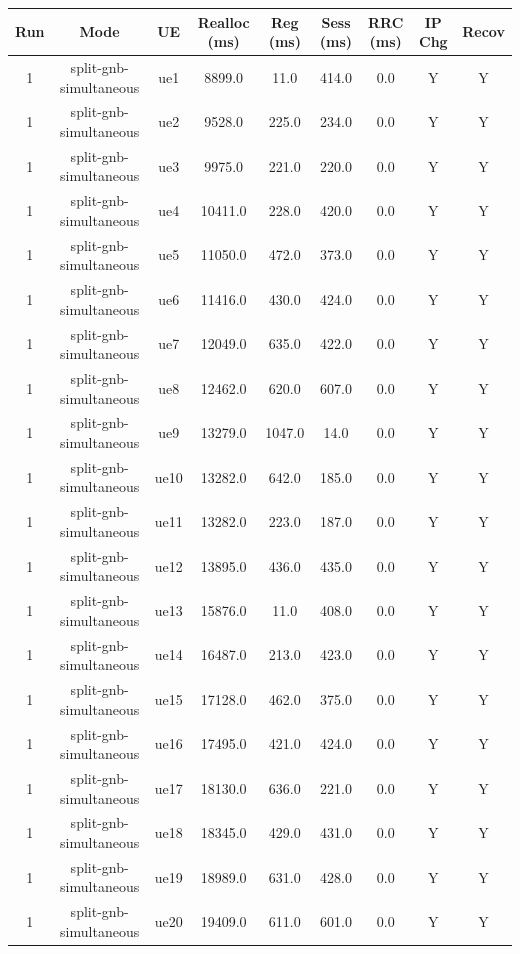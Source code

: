 \begin{table}[ht]
\centering
\begin{tabular}{|c|c|c|c|c|c|c|c|c|}
\hline
Run & Mode & UE & Realloc (ms) & Reg (ms) & Sess (ms) & RRC (ms) & IP Chg & Recov \\
\hline
1 & split-gnb-simultaneous & ue1 & 8899.0 & 11.0 & 414.0 & 0.0 & Y & Y \\
1 & split-gnb-simultaneous & ue2 & 9528.0 & 225.0 & 234.0 & 0.0 & Y & Y \\
1 & split-gnb-simultaneous & ue3 & 9975.0 & 221.0 & 220.0 & 0.0 & Y & Y \\
1 & split-gnb-simultaneous & ue4 & 10411.0 & 228.0 & 420.0 & 0.0 & Y & Y \\
1 & split-gnb-simultaneous & ue5 & 11050.0 & 472.0 & 373.0 & 0.0 & Y & Y \\
1 & split-gnb-simultaneous & ue6 & 11416.0 & 430.0 & 424.0 & 0.0 & Y & Y \\
1 & split-gnb-simultaneous & ue7 & 12049.0 & 635.0 & 422.0 & 0.0 & Y & Y \\
1 & split-gnb-simultaneous & ue8 & 12462.0 & 620.0 & 607.0 & 0.0 & Y & Y \\
1 & split-gnb-simultaneous & ue9 & 13279.0 & 1047.0 & 14.0 & 0.0 & Y & Y \\
1 & split-gnb-simultaneous & ue10 & 13282.0 & 642.0 & 185.0 & 0.0 & Y & Y \\
1 & split-gnb-simultaneous & ue11 & 13282.0 & 223.0 & 187.0 & 0.0 & Y & Y \\
1 & split-gnb-simultaneous & ue12 & 13895.0 & 436.0 & 435.0 & 0.0 & Y & Y \\
1 & split-gnb-simultaneous & ue13 & 15876.0 & 11.0 & 408.0 & 0.0 & Y & Y \\
1 & split-gnb-simultaneous & ue14 & 16487.0 & 213.0 & 423.0 & 0.0 & Y & Y \\
1 & split-gnb-simultaneous & ue15 & 17128.0 & 462.0 & 375.0 & 0.0 & Y & Y \\
1 & split-gnb-simultaneous & ue16 & 17495.0 & 421.0 & 424.0 & 0.0 & Y & Y \\
1 & split-gnb-simultaneous & ue17 & 18130.0 & 636.0 & 221.0 & 0.0 & Y & Y \\
1 & split-gnb-simultaneous & ue18 & 18345.0 & 429.0 & 431.0 & 0.0 & Y & Y \\
1 & split-gnb-simultaneous & ue19 & 18989.0 & 631.0 & 428.0 & 0.0 & Y & Y \\
1 & split-gnb-simultaneous & ue20 & 19409.0 & 611.0 & 601.0 & 0.0 & Y & Y \\

\end{tabular}
\end{table}
